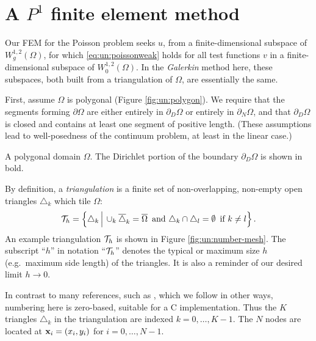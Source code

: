 \section{A $P^1$ finite element method}

Our FEM for the Poisson problem seeks $u$, from a finite-dimensional subspace of $W^{1,2}_g(\Omega)$, for which \eqref{eq:un:poissonweak} holds for all test functions $v$ in a finite-dimensional subspace of $W^{1,2}_0(\Omega)$.  In the \emph{Galerkin} method here, these subspaces, both built from a triangulation of $\Omega$, are essentially the same.

First, assume $\Omega$ is polygonal (Figure \ref{fig:un:polygon}).  We require that the segments forming $\partial\Omega$ are either entirely in $\partial_D\Omega$ or entirely in $\partial_N\Omega$, and that $\partial_D\Omega$ is closed and contains at least one segment of positive length.  (These assumptions lead to well-posedness of the continuum problem, at least in the linear case.)

\begin{marginfigure}

\caption{A polygonal domain $\Omega$.  The Dirichlet portion of the boundary $\partial_D\Omega$ is shown in bold.}
\label{fig:un:polygon}
\end{marginfigure}

By definition, a \emph{triangulation} is a finite set of non-overlapping, non-empty open triangles $\triangle_k$ which tile $\Omega$:
\begin{equation}
\mathcal{T}_h = \left\{\triangle_k \,\Big|\, \cup_k \overline{\triangle}_k = \overline{\Omega} \, \text{ and} \,\, \triangle_k \cap \triangle_l = \emptyset \, \text{ if } k\ne l\right\}. \label{eq:un:triangulation}
\end{equation}
An example triangulation $\mathcal{T}_h$ is shown in Figure \ref{fig:un:number-mesh}.  The subscript ``$h$'' in notation ``$\mathcal{T}_h$'' denotes the typical or maximum size $h$ (e.g.~maximum side length) of the triangles.  It is also a reminder of our desired limit $h\to 0$.

In contrast to many references, such as \citet{Elmanetal2005}, which we follow in other ways, numbering here is zero-based, suitable for a C implementation.  Thus the $K$ triangles $\triangle_k$ in the triangulation are indexed $k=0,\dots,K-1$.  The $N$ nodes are located at $\mathbf{x}_i=(x_i,y_i)$ for $i=0,\dots,N-1$. 

